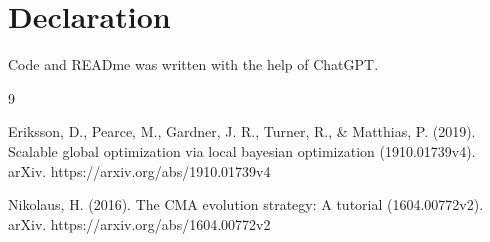 \documentclass[12pt]{article}
\begin{document}
\section{Declaration}
Code and READme was written with the help of ChatGPT.
\begin{thebibliography}{9}

 Eriksson, D., Pearce, M., Gardner, J. R., Turner, R., \& Matthias, P. (2019). Scalable global optimization via local bayesian optimization (1910.01739v4). arXiv. https://arxiv.org/abs/1910.01739v4

 Nikolaus, H. (2016). The CMA evolution strategy: A tutorial (1604.00772v2). arXiv. https://arxiv.org/abs/1604.00772v2

\end{thebibliography}
\end{document}
